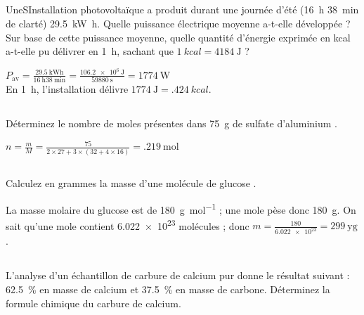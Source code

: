 \subsection{}
UneSInstallation photovoltaïque a produit durant une journée d'été (\SI{16}{\hour} \SI{38}{\minute} de clarté) \SI{29.5}{\kilo\watt\hour}. Quelle puissance électrique moyenne a-t-elle développée ? Sur base de cette puissance moyenne, quelle quantité d'énergie exprimée en kcal a-t-elle pu délivrer en \SI{1}{\hour}, sachant que $ \SI{1}{kcal} = \SI{4184}{\joule} $ ?

\begin{solution}
    $ P_\mathrm{av} = \frac{\SI{29.5}{\kilo\watt\hour}}{\SI{16}{\hour} \SI{38}{\minute}} = \frac{\SI{106.2e6}{\joule}}{\SI{59880}{\second}} = \SI{1774}{\watt} $ \\
    En \SI{1}{\hour}, l'installation délivre $ \SI{1774}{\joule} = \SI{.424}{kcal} $.
\end{solution}

\subsection{}
Déterminez le nombre de moles présentes dans \SI{75}{\gram} de sulfate d'aluminium .

\begin{solution}
    $ n = \frac{m}{M} = \frac{75}{2 \times 27 + 3 \times (32 + 4 \times 16)} = \SI{.219}{\mole} $
\end{solution}

\subsection{}
Calculez en grammes la masse d'une molécule de glucose .

\begin{solution}
    La masse molaire du glucose est de \SI{180}{\gram\per\mole} ; une mole pèse donc \SI{180}{\gram}. On sait qu'une mole contient \num{6.022e23} molécules ; donc $ m = \frac{\num{180}}{\num{6.022e23}} = \SI{299}{\yocto\gram} $.
\end{solution}

\subsection{}
L'analyse d'un échantillon de carbure de calcium pur donne le résultat suivant : \SI{62.5}{\%} en masse de calcium et \SI{37.5}{\%} en masse de carbone. Déterminez la formule chimique du carbure de calcium.

